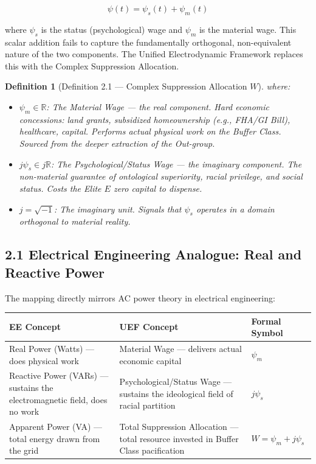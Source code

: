 \documentclass[12pt]{book}
\numberwithin{equation}{chapter}
\newtheorem{definition}{Definition}[chapter]
\begin{document}
\begin{equation}
\psi(t) = \psi_s(t) + \psi_m(t)
\label{eq:uef-prior-model}
\end{equation}

    where $\psi_s$ is the status (psychological) wage and $\psi_m$ is the material wage. This scalar addition fails to capture the fundamentally orthogonal, non-equivalent nature of the two components. The Unified Electrodynamic Framework replaces this with the Complex Suppression Allocation.
  

\begin{definition}[Definition 2.1 — Complex Suppression Allocation $W$]
    where:
    
\begin{itemize}

\item $\psi_m \in \mathbb{R}$: The \emph{Material Wage} — the real component. Hard economic concessions: land grants, subsidized homeownership (e.g., FHA/GI Bill), healthcare, capital. Performs actual physical work on the Buffer Class. Sourced from the deeper extraction of the Out-group.

\item $j\psi_s \in j\mathbb{R}$: The \emph{Psychological/Status Wage} — the imaginary component. The non-material guarantee of ontological superiority, racial privilege, and social status. Costs the Elite $E$ zero capital to dispense.

\item $j = \sqrt{-1}$: The imaginary unit. Signals that $\psi_s$ operates in a domain \emph{orthogonal} to material reality.

\end{itemize}

\end{definition}

\subsection{2.1 Electrical Engineering Analogue: Real and Reactive Power}

    The mapping directly mirrors AC power theory in electrical engineering:
  

\begin{center}
\begin{tabular}{lll}
\toprule
EE Concept & UEF Concept & Formal Symbol  \\
\midrule
Real Power (Watts) — does physical work & Material Wage — delivers actual economic capital & $\psi_m$  \\
Reactive Power (VARs) — sustains the electromagnetic field, does no work & Psychological/Status Wage — sustains the ideological field of racial partition & $j\psi_s$  \\
Apparent Power (VA) — total energy drawn from the grid & Total Suppression Allocation — total resource invested in Buffer Class pacification & $W = \psi_m + j\psi_s$  \\
\bottomrule
\end{tabular}
\end{center}
\end{document}
